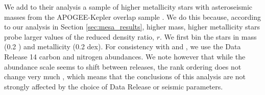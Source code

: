 

We add to their analysis a sample of higher metallicity stars with asteroseismic masses from the APOGEE-Kepler overlap sample \citep[APOKASC,][]{Pinsonneault2014, Pinsonneault2018}. We do this because, according to our analysis in Section \ref{sec:mesa_results}, higher mass, higher metallicity stars probe larger values of the reduced density ratio, $r$. %
We first bin the stars in mass (0.2 \msun) and  metallicity (0.2 dex). For consistency with \citet{Pinsonneault2018} and \citet{Shetrone2019}, we use the Data Release 14 \citet{DR14} carbon and nitrogen abundances. We note however that while the abundance scale seems to shift between releases, the rank ordering does not change very much \citep{Spoo2022}, which means that the conclusions of this analysis are not strongly affected by the choice of Data Release or seismic parameters.

